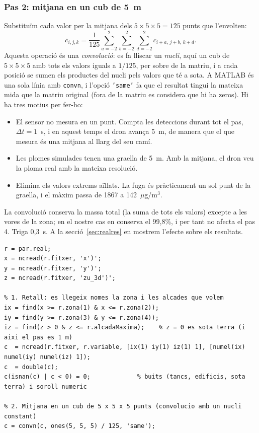 \documentclass[11pt,a4paper]{article}
\begin{document}
\subsubsection*{Pas 2: mitjana en un cub de 5~m}

Substituïm cada valor per la mitjana dels $5 \times 5 \times 5 = 125$ punts que l'envolten:
\begin{equation}
\bar c_{i,j,k} = \frac{1}{125} \sum_{a=-2}^{2} \sum_{b=-2}^{2} \sum_{d=-2}^{2} c_{i+a,\, j+b,\, k+d}.
\end{equation}
Aquesta operació és una \emph{convolució}: es fa lliscar un \emph{nucli}, aquí un cub de $5 \times 5 \times 5$ amb tots els valors iguals a $1/125$, per sobre de la matriu, i a cada posició se sumen els productes del nucli pels valors que té a sota. A MATLAB és una sola línia amb \texttt{convn}, i l'opció \texttt{'same'} fa que el resultat tingui la mateixa mida que la matriu original (fora de la matriu es considera que hi ha zeros). Hi ha tres motius per fer-ho:
\begin{itemize}
\item El sensor no mesura en un punt. Compta les deteccions durant tot el pas, $\Delta t = 1$~s, i en aquest temps el dron avança 5~m, de manera que el que mesura és una mitjana al llarg del seu camí.
\item Les plomes simulades tenen una graella de 5~m. Amb la mitjana, el dron veu la ploma real amb la mateixa resolució.
\item Elimina els valors extrems aïllats. La fuga és pràcticament un sol punt de la graella, i el màxim passa de 1867 a 142~$\mu$g/m$^3$.
\end{itemize}
La convolució conserva la massa total (la suma de tots els valors) excepte a les vores de la zona; en el nostre cas en conserva el 99,8\%, i per tant no afecta el pas 4. Triga 0,3~s. A la secció~\ref{sec:realres} en mostrem l'efecte sobre els resultats.

\begin{lstlisting}[caption={Passos 1 i 2 de \texttt{Ploma.importarPalm}: retall i mitjana.}, label=lst:importar1]
r = par.real;
x = ncread(r.fitxer, 'x')';
y = ncread(r.fitxer, 'y')';
z = ncread(r.fitxer, 'zu_3d')';

% 1. Retall: es llegeix nomes la zona i les alcades que volem
ix = find(x >= r.zona(1) & x <= r.zona(2));
iy = find(y >= r.zona(3) & y <= r.zona(4));
iz = find(z > 0 & z <= r.alcadaMaxima);    % z = 0 es sota terra (i aixi el pas es 1 m)
c  = ncread(r.fitxer, r.variable, [ix(1) iy(1) iz(1) 1], [numel(ix) numel(iy) numel(iz) 1]);
c  = double(c);
c(isnan(c) | c < 0) = 0;             % buits (tancs, edificis, sota terra) i soroll numeric

% 2. Mitjana en un cub de 5 x 5 x 5 punts (convolucio amb un nucli constant)
c = convn(c, ones(5, 5, 5) / 125, 'same');
\end{lstlisting}
\end{document}
